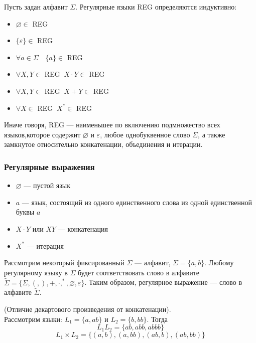\documentclass[11pt]{article}
\begin{document}
\begin{definition}
    Пусть задан алфавит $\Sigma$. Регулярные языки REG определяются индуктивно:
    \begin{itemize}
        \item $\varnothing \in$ REG
        \item $\{\varepsilon\} \in $ REG
        \item $\forall a\in \Sigma \quad \{a\} \in $ REG
        \item $\forall X,Y\in $ REG $\ X\cdot Y\in$ REG
        \item $\forall X,Y\in $ REG $\ X+ Y\in$ REG
        \item $\forall X\in$ REG $\ X^*\in$ REG
    \end{itemize}
    Иначе говоря, REG --- наименьшее по включению подмножество всех языков,которое содержит $\varnothing$
    и $\varepsilon$, любое однобуквенное слово $\Sigma$, а также замкнутое относительно конкатенации, объединения и итерации.
\end{definition}

\subsubsection*{Регулярные выражения}
\begin{itemize}
    \item $\varnothing$ --- пустой язык
    \item $a$ --- язык, состоящий из одного единственного слова из одной единственной буквы $a$
    \item $X\cdot Y$ или $XY$ --- конкатенация
    \item $X^*$ --- итерация
\end{itemize}

\begin{remark}
    Рассмотрим некоторый фиксированный $\Sigma$ --- алфавит, $\Sigma= \{a,b\} $. Любому
    регулярному языку в $\Sigma$ будет соответствовать слово в алфавите $\tilde\Sigma= \{ \Sigma, ( ,) , +, \cdot, ^* , \varnothing, \varepsilon \}$. 
    Таким образом, регулярное выражение --- слово в алфавите $\tilde\Sigma$.
\end{remark}

\begin{remark}
    (Отличие декартового произведения от конкатенации).\\
     Рассмотрим языки: $L_1=\{a, ab\}$ и $L_2=\{b,bb\}$. Тогда 
     \[ L_1L_2 = \{ab,abb, abbb \} \]
     \[ L_1 \times L_2= \{ (a,b), (a,bb), (ab,b), (ab,bb) \} \]
\end{remark}
\end{document}
